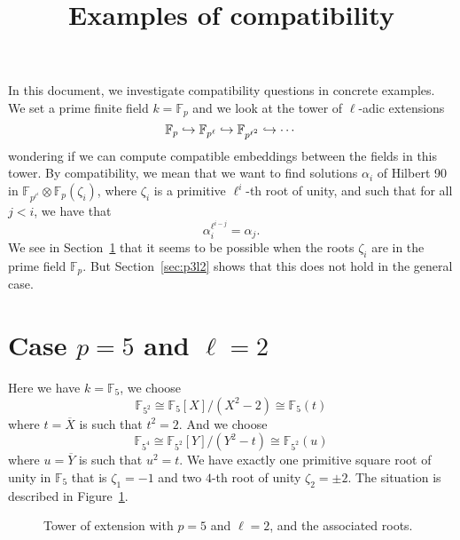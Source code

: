\documentclass[a4paper,11pt]{article}
\title{Examples of compatibility}
\author{}
\begin{document}
\maketitle





In this document, we investigate compatibility questions in concrete examples.
We set a prime finite field $k=\mathbb{F}_p$ and we look at the tower of
$\ell$-adic extensions 
\[
  \mathbb{F}_p \hookrightarrow \mathbb{F}_{p^\ell} \hookrightarrow \mathbb{F}_{p^{\ell^2}}\hookrightarrow \cdots
\]
wondering if we can compute compatible embeddings between the fields in this
tower. By compatibility, we mean that we want to find solutions $\alpha_i$ of
Hilbert 90 in $\mathbb{F}_{p^{\ell^i}}\otimes\mathbb{F}_p(\zeta_i)$, where
$\zeta_i$ is a primitive $\ell^i$-th root of unity, and such that for all $j<i$, we
have that 
\[
  \alpha_i^{\ell^{i-j}}=\alpha_j.
\]
We see in Section~\ref{sec:p5l2} that it seems to be possible when the roots
$\zeta_i$ are in the prime field $\mathbb{F}_p$. But Section~\ref{sec:p3l2}
shows that this does not hold in the general case.

\section{Case $p=5$ and $\ell=2$}
\label{sec:p5l2}

Here we have $k=\mathbb{F}_5$,
we choose
\[
  \mathbb{F}_{5^2}\cong\mathbb{F}_5[X]/(X^2-2)\cong\mathbb{F}_5(t)
\]
where
$t=\overline X$ is such that $t^2=2$. And we choose 
\[
  \mathbb{F}_{5^4}\cong
\mathbb{F}_{5^2}[Y]/(Y^2-t)\cong \mathbb{F}_{5^2}(u)
\]
where $u=\overline
Y$ is such that $u^2 = t$. We have exactly one primitive square root of
unity in $\mathbb{F}_5$ that is $\zeta_1 = -1$ and two $4$-th
root of unity $\zeta_2=\pm 2$. The situation is described in
Figure~\ref{fig:p5l2}.

\begin{figure}
  \centering
{}
\phantom{and}
  \caption{Tower of extension with $p=5$ and $\ell=2$, and the associated roots.}
  \label{fig:p5l2}
\end{figure}
\end{document}
